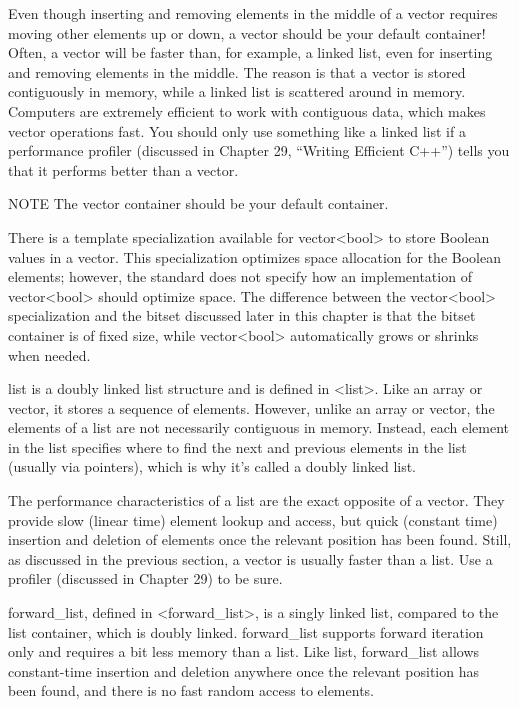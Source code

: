 Even though inserting and removing elements in the middle of a vector requires moving other elements up or down, a vector should be your default container! Often, a vector will be faster than, for example, a linked list, even for inserting and removing elements in the middle. The reason is that a vector is stored contiguously in memory, while a linked list is scattered around in memory. Computers are extremely efficient to work with contiguous data, which makes vector operations fast. You should only use something like a linked list if a performance profiler (discussed in Chapter 29, “Writing Efficient C++”) tells you that it performs better than a vector.

\begin{myNotic}{NOTE}
The vector container should be your default container.
\end{myNotic}

There is a template specialization available for vector<bool> to store Boolean values in a vector.
This specialization optimizes space allocation for the Boolean elements; however, the standard does not specify how an implementation of vector<bool> should optimize space. The difference between the vector<bool> specialization and the bitset discussed later in this chapter is that the bitset container is of fixed size, while vector<bool> automatically grows or shrinks when needed.


list is a doubly linked list structure and is defined in <list>. Like an array or vector, it stores a sequence of elements. However, unlike an array or vector, the elements of a list are not necessarily contiguous in memory. Instead, each element in the list specifies where to find the next and previous elements in the list (usually via pointers), which is why it’s called a doubly linked list.

The performance characteristics of a list are the exact opposite of a vector. They provide slow (linear time) element lookup and access, but quick (constant time) insertion and deletion of elements once the relevant position has been found. Still, as discussed in the previous section, a vector is usually faster than a list. Use a profiler (discussed in Chapter 29) to be sure.


forward\_list, defined in <forward\_list>, is a singly linked list, compared to the list container, which is doubly linked. forward\_list supports forward iteration only and requires a bit less memory than a list. Like list, forward\_list allows constant-time insertion and deletion anywhere once the relevant position has been found, and there is no fast random access to elements.

